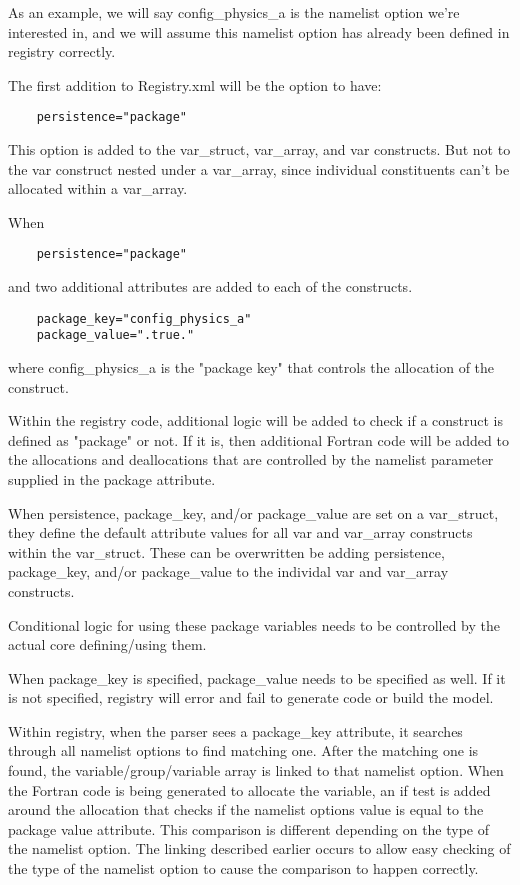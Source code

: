 \documentclass[11pt]{report}
\begin{document}
As an example, we will say config\_physics\_a is the namelist option we're
interested in, and we will assume this namelist option has already been defined
in registry correctly.

The first addition to Registry.xml will be the option to have:
\begin{lstlisting}
	persistence="package"
\end{lstlisting}

This option is added to the var\_struct, var\_array, and var constructs.
But not to the var construct nested under a var\_array, since individual
constituents can't be allocated within a var\_array.

When
\begin{lstlisting}
	persistence="package"
\end{lstlisting}
and two additional attributes are added to each of the constructs.
\begin{lstlisting}
	package_key="config_physics_a"
	package_value=".true."
\end{lstlisting}
where config\_physics\_a is the "package key" that controls the allocation of the construct.

Within the registry code, additional logic will be added to check if a
construct is defined as "package" or not. If it is, then additional Fortran
code will be added to the allocations and deallocations that are controlled by
the namelist parameter supplied in the package attribute.

When persistence, package\_key, and/or package\_value are set on a var\_struct,
they define the default attribute values for all var and var\_array constructs
within the var\_struct. These can be overwritten be adding persistence, 
package\_key, and/or package\_value to the individal var and var\_array constructs.

Conditional logic for using these package variables needs to be controlled by
the actual core defining/using them.

When package\_key is specified, package\_value needs to be specified as well.
If it is not specified, registry will error and fail to generate code or build
the model.

Within registry, when the parser sees a package\_key attribute, it searches
through all namelist options to find matching one. After the matching one is
found, the variable/group/variable array is linked to that namelist option.
When the Fortran code is being generated to allocate the variable, an if test
is added around the allocation that checks if the namelist options value is
equal to the package value attribute. This comparison is different depending on
the type of the namelist option. The linking described earlier occurs to allow
easy checking of the type of the namelist option to cause the comparison to
happen correctly.
\end{document}
